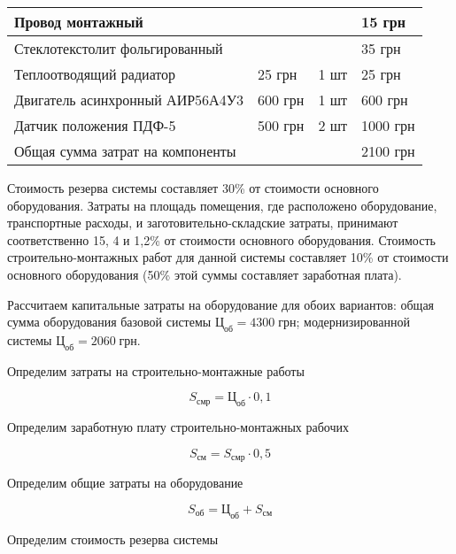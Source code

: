 \begin{longtable}{|p{8cm}|p{}|p{}|p{}|}
        \hline
        Провод монтажный & & & 15 грн\\
        \hline
        Стеклотекстолит фольгированный & & & 35 грн\\
        \hline
        Теплоотводящий радиатор  & 25 грн & 1 шт & 25 грн\\
        \hline
        Двигатель асинхронный АИР56А4У3 & 600 грн & 1 шт & 600 грн\\
        \hline
        Датчик положения ПДФ-5 & 500 грн & 2 шт & 1000 грн\\
        \hline
        \multicolumn{3}{|l|}{Общая сумма затрат на компоненты} & 2100 грн\\
        \hline
        \end{longtable}

        Стоимость резерва системы составляет 30\% от стоимости основного
        оборудования. Затраты на площадь помещения, где расположено
        оборудование, транспортные расходы, и заготовительно-складские затраты,
        принимают соответственно 15, 4 и 1,2\% от стоимости основного
        оборудования. Стоимость строительно-монтажных работ для данной системы
        составляет 10\% от стоимости основного оборудования (50\% этой суммы
        составляет заработная плата).

        Рассчитаем капитальные затраты на оборудование для обоих вариантов:
        общая сумма оборудования базовой системы $Ц_{об} = 4300 \; \text{грн}$;
        модернизированной системы $Ц_{об} = 2060 \; \text{грн}$.

        Определим затраты на строительно-монтажные работы

        \begin{equation}
            S_\text{смр} = \text{Ц}_\text{об} \cdot 0,1
        \end{equation}

        Определим заработную плату строительно-монтажных рабочих

        \begin{equation}
            S_\text{см} = S_\text{смр} \cdot 0,5
        \end{equation}

        Определим общие затраты на оборудование

        \begin{equation}
            S_\text{об} = \text{Ц}_\text{об} + S_\text{см} 
        \end{equation}

        Определим стоимость резерва системы


